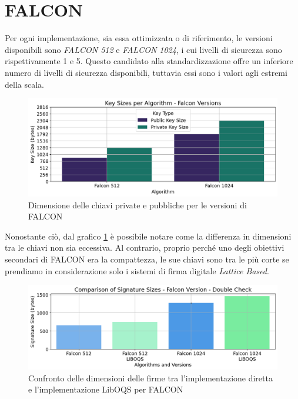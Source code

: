 \section{FALCON}

Per ogni implementazione, sia essa ottimizzata o di riferimento, le versioni disponibili sono \textit{FALCON 512} e \textit{FALCON 1024}, i cui livelli di sicurezza sono rispettivamente 1 e 5. Questo candidato alla standardizzazione offre un inferiore numero di livelli di sicurezza disponibili, tuttavia essi sono i valori agli estremi della scala.

\begin{figure}[H]
    \centering
    \includegraphics[width=1\textwidth]{Immagini/20240822_i9/Key_Sizes/KC_falcon.png}
    \caption{Dimensione delle chiavi private e pubbliche per le versioni di FALCON}
    \label{fig:KC_falcon}
\end{figure}

Nonostante ciò, dal grafico \ref{fig:KC_falcon} è possibile notare come la differenza in dimensioni tra le chiavi non sia eccessiva. Al contrario, proprio perché uno degli obiettivi secondari di FALCON era la compattezza, le sue chiavi sono tra le più corte se prendiamo in considerazione solo i sistemi di firma digitale \textit{Lattice Based}.

\begin{figure}[H]
    \centering
    \includegraphics[width=1\textwidth]{Immagini/20240822_i9/Message_IO/double_check/IO_falcon.png}
    \caption{Confronto delle dimensioni delle firme tra l'implementazione diretta e l'implementazione LibOQS per FALCON}
    \label{fig:IO_falcon}
\end{figure}

